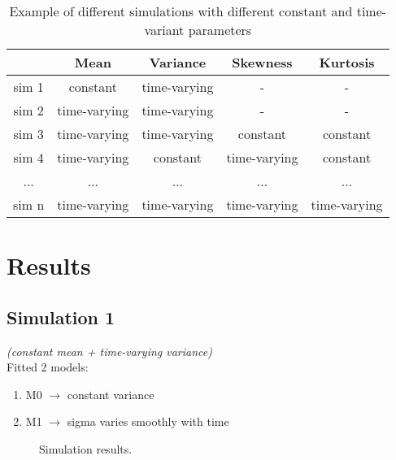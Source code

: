 \documentclass{article}
\begin{document}
\begin{table} [h]
    \centering
    \caption{Example of different simulations with different constant and time-variant parameters}
    \begin{tabular}{c|cccc}
          & Mean & Variance & Skewness & Kurtosis \\
         \hline
         sim 1 & constant & time-varying & - & - \\
         sim 2 & time-varying & time-varying & - & - \\
         sim 3 & time-varying & time-varying & constant & constant  \\
         sim 4 & time-varying & constant & time-varying & constant \\
         ... &  ... & ... & ... & ... \\
         sim n &  time-varying & time-varying & time-varying & time-varying
    \end{tabular}
    \label{simtable}
\end{table}

\section*{Results}

\subsection{Simulation 1}
\textit{(constant mean + time-varying variance)} \\

\noindent Fitted 2 models:

\begin{enumerate}
    \item M0 $\rightarrow$ constant variance 
    \item M1 $\rightarrow$ sigma varies smoothly with time
\end{enumerate}

\begin{figure}[h]
\centering
\caption{Simulation results.}
\end{figure}
\end{document}

